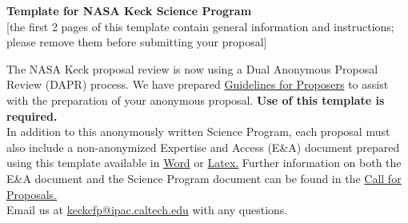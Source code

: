 \documentclass[12pt]{article}
\begin{document}

\hspace{2.0in} 

\begin{center}
\Large{\bf{Template for NASA Keck Science Program}} \\
\small{[the first 2 pages of this template contain general information and instructions; please remove them before submitting your proposal]}
\end{center}

\noindent
The NASA Keck proposal review is now using a Dual Anonymous Proposal Review (DAPR) process.  We have prepared  
\href{https://nexsci.caltech.edu/missions/KeckSolicitation/DAPR_proposer.shtml}{Guidelines for Proposers} 
to assist with the preparation of your anonymous proposal.  {\bf Use of this template is required.} \\

\noindent
In addition to this anonymously written Science Program, each proposal must also include a non-anonymized Expertise and Access (E\&A) document 
prepared using this template available in 
\href{https://nexsci.caltech.edu/missions/KeckSolicitation/EA_template.docx}{Word} 
or 
\href{https://nexsci.caltech.edu/missions/KeckSolicitation/EA_template.tex}{Latex.} 
Further information on both the E\&A document and the Science Program document can be found in the
\href{https://nexsci.caltech.edu/missions/KeckSolicitation/gen_info.shtml}{Call for Proposals.} \\

\noindent
Email us at \href{mailto:keckcfp@ipac.caltech.edu}{keckcfp@ipac.caltech.edu} with any questions.\\
\end{document}
